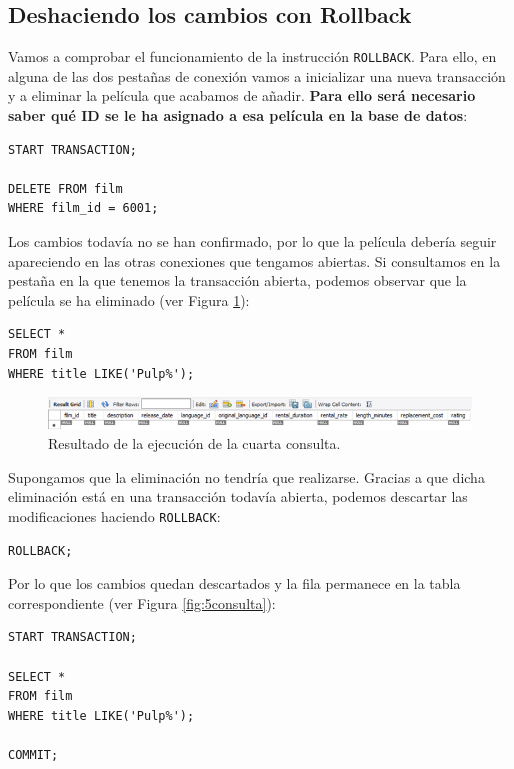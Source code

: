 \documentclass[a4paper]{article}
\begin{document}
\subsection*{Deshaciendo los cambios con Rollback}

Vamos a comprobar el funcionamiento de la instrucción \texttt{ROLLBACK}. Para ello, en alguna de las dos pestañas de conexión vamos a inicializar una nueva transacción y a eliminar la película que acabamos de añadir. \textbf{Para ello será necesario saber qué ID se le ha asignado a esa película en la base de datos}:

\begin{verbatim}
START TRANSACTION;

DELETE FROM film 
WHERE film_id = 6001;
\end{verbatim}

Los cambios todavía no se han confirmado, por lo que la película debería seguir apareciendo en las otras conexiones que tengamos abiertas. Si consultamos en la pestaña en la que tenemos la transacción abierta, podemos observar que la película se ha eliminado (ver Figura \ref{fig:4consulta}):

\begin{verbatim}
SELECT * 
FROM film
WHERE title LIKE('Pulp%');
\end{verbatim}

\begin{figure}[ht]
    \centering
    \includegraphics[width=0.9\columnwidth]{figs/4consulta.png}
    \caption{Resultado de la ejecución de la cuarta consulta.}\label{fig:4consulta}
\end{figure}

Supongamos que la eliminación no tendría que realizarse. Gracias a que dicha eliminación está en una transacción todavía abierta, podemos descartar las modificaciones haciendo \texttt{ROLLBACK}:

\begin{verbatim}
ROLLBACK;
\end{verbatim}

Por lo que los cambios quedan descartados y la fila permanece en la tabla correspondiente (ver Figura \ref{fig:5consulta}):

\begin{verbatim}
START TRANSACTION;

SELECT * 
FROM film
WHERE title LIKE('Pulp%');

COMMIT;
\end{verbatim}
\end{document}
